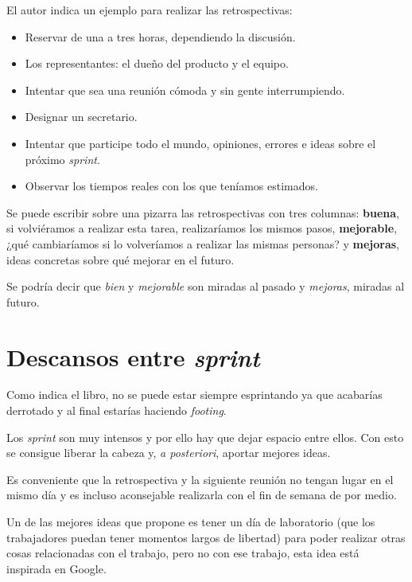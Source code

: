 El autor indica un ejemplo para realizar las retrospectivas:

\begin{itemize}
	\item Reservar de una a tres horas, dependiendo la discusión.
	\item Los representantes: el dueño del producto y el equipo.
	\item Intentar que sea una reunión cómoda y sin gente interrumpiendo.
	\item Designar un secretario.
	\item Intentar que participe todo el mundo, opiniones, errores e ideas sobre el próximo \textit{sprint}.
	\item Observar los tiempos reales con los que teníamos estimados.
\end{itemize}

Se puede escribir sobre una pizarra las retrospectivas con tres columnas: \textbf{buena}, si volviéramos a realizar esta tarea, realizaríamos los mismos pasos, \textbf{mejorable}, ¿qué cambiaríamos si lo volveríamos a realizar las mismas personas? y \textbf{mejoras}, ideas concretas sobre qué mejorar en el futuro.

Se podría decir que \textit{bien} y \textit{mejorable} son miradas al pasado y \textit{mejoras}, miradas al futuro.

\section{Descansos entre \textit{sprint}}

Como indica el libro, no se puede estar siempre esprintando ya que acabarías derrotado y al final estarías haciendo \textit{footing}.

Los \textit{sprint} son muy intensos y por ello hay que dejar espacio entre ellos. Con esto se consigue liberar la cabeza y, \textit{a posteriori}, aportar mejores ideas.

Es conveniente que la retrospectiva y la siguiente reunión no tengan lugar en el mismo día y es incluso aconsejable realizarla con el fin de semana de por medio.

Un de las mejores ideas que propone es tener un día de laboratorio (que los trabajadores puedan tener momentos largos de libertad) para poder realizar otras cosas relacionadas con el trabajo, pero no con ese trabajo, esta idea está inspirada en Google.


